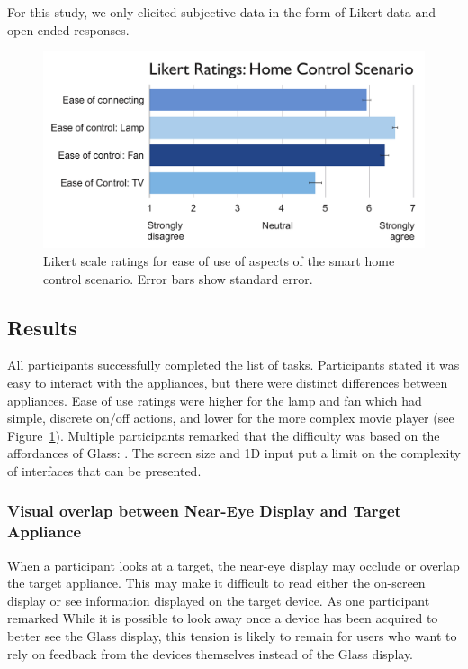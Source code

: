 For this study, we only elicited subjective data in the form of Likert data and open-ended responses.
\begin{figure}[b]
\centering
\includegraphics[width=1.0\columnwidth]{figures/scenario-likert.pdf}
\caption{Likert scale ratings for ease of use of aspects of the smart home control scenario. Error bars show standard error.}
\label{fig:smarthome-likert}
\end{figure}

\subsection{Results}
All participants successfully completed the list of tasks.
Participants stated it was easy to interact with the appliances, but there were distinct differences between appliances. Ease of use ratings were higher for the lamp and fan which had simple, discrete on/off actions, and lower for the more complex movie player (see Figure~\ref{fig:smarthome-likert}). Multiple participants remarked that the difficulty was based on the affordances of Glass: . The screen size and 1D input put a limit on the complexity of interfaces that can be presented.

\subsubsection{Visual overlap between Near-Eye Display and Target Appliance}
When a participant looks at a target, the near-eye display may occlude or overlap the target appliance. This may make it difficult to read either the on-screen display or see information displayed on the target device.  As one participant remarked  While it is possible to look away once a device has been acquired to better see the Glass display, this tension is likely to remain for users who want to rely on feedback from the devices themselves instead of the Glass display.



